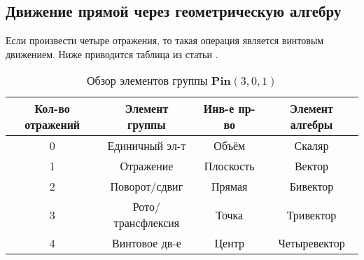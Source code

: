   \subsection{Движение прямой через геометрическую алгебру}
  Если произвести четыре отражения, то такая операция является винтовым движением. Ниже приводится таблица из статьи 
  \autocite{ruheGeometricCliffordAlgebra2023}. 

  \begin{table}[h!]
    \centering
    \caption{Обзор элементов группы $\mathbf{Pin}(3,0,1)$}
    \label{tab:example}
    \begin{tabular}{|c|c|c|c|} %
    \hline
    \textbf{Кол-во отражений} & \textbf{Элемент группы} & \textbf{Инв-е пр-во} & \textbf{Элемент алгебры} \\ \hline
    0 & Единичный эл-т & Объём & Скаляр \\ \hline
    1 & Отражение & Плоскость & Вектор \\ \hline
    2 & Поворот/сдвиг & Прямая & Бивектор \\ \hline
    3 & Рото/трансфлексия & Точка & Тривектор \\ \hline
    4 & Винтовое дв-е & Центр & Четыревектор \\ \hline

    \end{tabular}
    \end{table}



